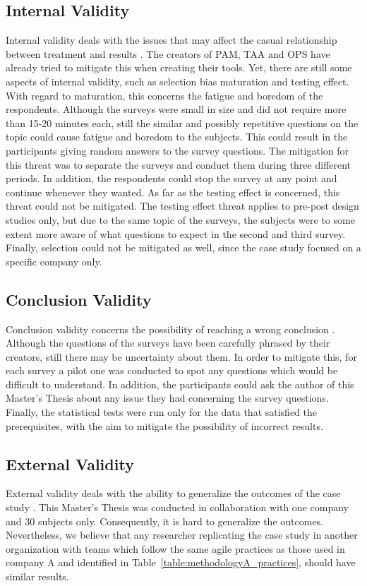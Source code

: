 \subsection{Internal Validity}
Internal validity deals with the issues that may affect the casual relationship between treatment and results \cite{Wohlin}. The creators of \ac{PAM}, \ac{TAA} and \ac{OPS} have already tried to mitigate this when creating their tools. Yet, there are still some aspects of internal validity, such as selection bias maturation and testing effect. With regard to maturation, this concerns the fatigue and boredom of the respondents. Although the surveys were small in size and did not require more than 15-20 minutes each, still the similar and possibly repetitive questions on the topic could cause fatigue and boredom to the subjects. This could result in the participants giving random answers to the survey questions. The mitigation for this threat was to separate the surveys and conduct them during three different periods. In addition, the respondents could stop the survey at any point and continue whenever they wanted. As far as the testing effect is concerned, this threat could not be mitigated. The testing effect threat applies to pre-post design studies only, but due to the same topic of the surveys, the subjects were to some extent more aware of what questions to expect in the second and third survey. Finally, selection could not be mitigated as well, since the case study focused on a specific company only.

\subsection{Conclusion Validity}
Conclusion validity concerns the possibility of reaching a wrong conclusion \cite{Wohlin}. Although the questions of the surveys have been carefully phrased by their creators, still there may be uncertainty about them. In order to mitigate this, for each survey a pilot one was conducted to spot any questions which would be difficult to understand. In addition, the participants could ask the author of this Master's Thesis about any issue they had concerning the survey questions. Finally, the statistical tests were run only for the data that satisfied the prerequisites, with the aim to mitigate the possibility of incorrect results. %

\subsection{External Validity}
External validity deals with the ability to generalize the outcomes of the case study \cite{Wohlin}. This Master's Thesis was conducted in collaboration with one company and 30 subjects only. Consequently, it is hard to generalize the outcomes. Nevertheless, we believe that any researcher replicating the case study in another organization with teams which follow the same agile practices as those used in company A and identified in Table~\ref{table:methodologyA_practices}, should have similar results.


